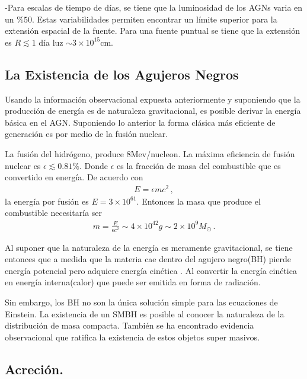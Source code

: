 -Para escalas de tiempo de días, se tiene que la luminosidad de los AGNs varia en un $\% 50$. Estas variabilidades permiten encontrar un límite superior para la extensión espacial de la fuente. Para una fuente puntual se tiene que la extensión es $R \lesssim 1$ día luz $\sim3\times10^{15}$cm.


	\subsection{La Existencia de los Agujeros Negros}
	\label{subsec:Why_a_BH}

Usando la información observacional expuesta anteriormente y suponiendo que la producción de energía es de naturaleza gravitacional, es posible derivar la energía básica en el AGN. Suponiendo lo anterior la forma clásica más eficiente de generación es por medio de la fusión nuclear. 

La fusión del hidrógeno, produce 8Mev/nucleon. La máxima eficiencia de fusión nuclear es $\epsilon \lesssim 0.81 \%$. Donde $\epsilon$ es la fracción de masa del combustible que es convertido en energía. De acuerdo con 
\begin{align}
E=\epsilon mc^{2}\,,
\end{align}
%
la energía por fusión es $E=3\times10^{61}$. Entonces la masa que produce el combustible necesitaría ser 
\begin{align}
m=\frac{E}{\epsilon c^{2}} \sim 4\times10^{42}g\sim 2\times10^{9}M_{\odot}\,.
\end{align}

Al suponer que la naturaleza de la energía es meramente gravitacional, se tiene entonces que a medida que la materia cae dentro del agujero negro(BH) pierde energía potencial pero adquiere energía cinética . Al convertir la energía cinética en energía interna(calor) que puede ser emitida en forma de radiación.

Sin embargo, los BH no son la única solución simple para las ecuaciones de Einstein. La existencia de un SMBH es posible al conocer la naturaleza de la distribución de masa compacta. También se ha encontrado evidencia observacional que ratifica la existencia de estos objetos super masivos. 

	\subsection{Acreción.}
	\label{subsec:Acretion}


